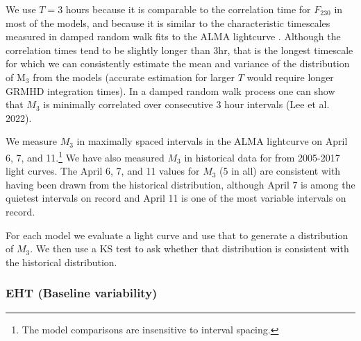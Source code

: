 We use $T = 3$ hours because it is comparable to the correlation time for $F_{230}$ in most of the models, and because it is similar to the characteristic timescales measured in damped random walk fits to the ALMA lightcurve \citep[see Table 10 of][]{Wielgus2022}.  Although the correlation times tend to be slightly longer than $3$hr, that is the longest timescale for which we can consistently estimate the mean and variance of the distribution of M$_3$ from the models (accurate estimation for larger $T$ would require longer GRMHD integration times).  In a damped random walk process one can show that $M_3$ is minimally correlated over consecutive 3 hour intervals (Lee et al. 2022).

We measure $M_3$ in maximally spaced intervals in the ALMA lightcurve on April 6, 7, and 11.\footnote{The model comparisons are insensitive to interval spacing.}  We have also measured $M_3$ in historical data for \sgra from 2005-2017 light curves.  The April 6, 7, and 11 values for $M_3$ (5 in all) are consistent with having been drawn from the historical distribution, although April 7 is among the quietest intervals on record and April 11 is one of the most variable intervals on record.

For each model we evaluate a light curve and use that to generate a distribution of $M_3$.  We then use a KS test to ask whether that distribution is consistent with the historical distribution.  

\subsubsection{EHT (Baseline variability)\\ }



